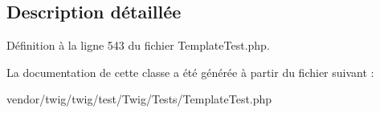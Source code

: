 \subsection{Description détaillée}


Définition à la ligne 543 du fichier Template\+Test.\+php.



La documentation de cette classe a été générée à partir du fichier suivant \+:\begin{DoxyCompactItemize}
\item 
vendor/twig/twig/test/\+Twig/\+Tests/Template\+Test.\+php\end{DoxyCompactItemize}
